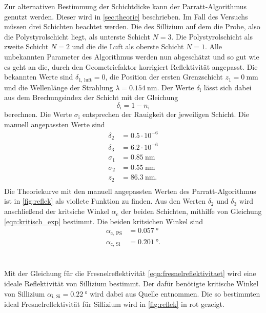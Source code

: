 Zur alternativen Bestimmung der Schichtdicke kann der Parratt-Algorithmus genutzt werden.
Dieser wird in \autoref{sec:theorie} beschrieben.
Im Fall des Versuchs müssen drei Schichten beachtet werden.
Die des Sillizium auf dem die Probe, also die Polystyrolschicht liegt, als unterste Schicht $N=3$.
Die Polystyrolschicht als zweite Schicht $N=2$ und die die Luft als oberste Schicht $N=1$.
Alle unbekannten Parameter des Algorithmus werden nun abgeschätzt und so gut wie es geht an die, durch den Geometriefaktor korrigiert Reflektivität angepasst.
Die bekannten Werte sind $\delta_\text{1, luft} = 0$, die Position der ersten Grenzschicht $z_1= \SI{0}{\milli\meter}$ und die Wellenlänge der Strahlung $\lambda =\SI{0.154}{\nano\meter}$.
Der Werte $\delta_\text{i}$ lässt sich dabei aus dem Brechungsindex der Schicht mit der Gleichung
\begin{equation}
    \delta_\text{i} = 1- n_\text{i}
\end{equation}
berechnen.
Die Werte $\sigma_\text{i}$ entsprechen der Rauigkeit der jeweiligen Schicht.
Die manuell angepassten Werte sind
\begin{align*}
    \delta_2 &= 0.5\cdot10^{-6}        \\ 
    \delta_3 &= 6.2\cdot10^{-6}        \\ 
    \sigma_1 &= \SI{0.85}{\nano\meter} \\ 
    \sigma_2 &= \SI{0.55}{\nano\meter} \\ 
    z_2 &= \SI{86.3}{\nano\meter}.  \\
\end{align*}
Die Theoriekurve mit den manuell angepassten Werten des Parratt-Algorithmus ist in \autoref{fig:reflek} als viollete Funktion zu finden.
Aus den Werten $\delta_2$ und $\delta_3$ wird anschließend der kritsiche Winkel $\alpha_\text{c}$ der beiden Schichten, mithilfe von Gleichung \eqref{eqn:kritisch_exp} bestimmt.
Die beiden kritsichen Winkel sind 
\begin{align*}
    \alpha_\text{c, PS} &= \SI{0.057}{\degree}\\
    \alpha_\text{c, Si} &= \SI{0.201}{\degree}.
\end{align*}
\\\\
Mit der Gleichung für die Fresnelreflektivität \eqref{eqn:fresnelreflektivitaet} wird eine ideale Reflektivität von Sillizium bestimmt.
Der dafür benötigte kritische Winkel von Sillizium $\alpha_\text{i, Si} = \SI{0.22}{\degree}$ wird dabei aus Quelle \cite[8]{alte_anleitung} entnommen.
Die so bestimmten ideal Fresnelreflektivität für Sillizium wird in \autoref{fig:reflek} in rot gezeigt.

